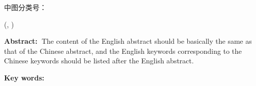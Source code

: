 \vspace*{4pt}
\fontsize{10.5pt}{25pt}
中图分类号：\textrm{\classification}
\vspace*{18pt}

{}
{}

\begin{center}
\fontsize{15.75pt}{\baselineskip}
\vspace*{24pt}
\textrm{\textbf{\sdnutitleen}}  %

\fontsize{12pt}{\baselineskip}
\vspace*{12pt}
\textrm{\sdnuauthorens} %

\textrm{(\sdnucollegeen, \sdnuen)} %

\end{center}

\fontsize{12pt}{25pt}
\textbf{Abstract:~}The content of the English abstract should be basically the same as that of the Chinese abstract, and the English keywords corresponding to the Chinese keywords should be listed after the English abstract.

\vspace*{6pt}
\textbf{Key words:~}\sdnukeywen
\label{abstract}
